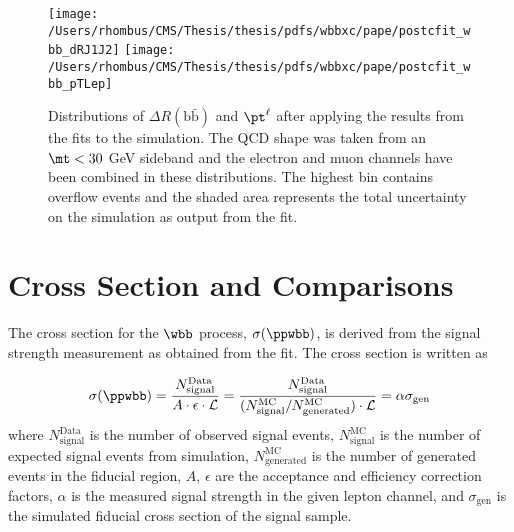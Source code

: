\begin{figure}[!htb]
\center
\texttt{[image: /Users/rhombus/CMS/Thesis/thesis/pdfs/wbbxc/pape/postcfit\_wbb\_dRJ1J2]}
\texttt{[image: /Users/rhombus/CMS/Thesis/thesis/pdfs/wbbxc/pape/postcfit\_wbb\_pTLep]}
\caption{
  Distributions of $\Delta R(\mathrm{b\bar{b}})$ and $\pt^\ell$ after
   applying the results from the fits to the simulation.
  The QCD shape was taken from an $\mt<30$ GeV sideband and the
   electron and muon channels have been combined in these distributions.
  The highest bin contains overflow events and
   the shaded area represents the total uncertainty on the simulation as output from the fit.
 }
\label{fig:postfit_drbb_ptl}
\end{figure}

\section{Cross Section and Comparisons}

The cross section for the $\wbb$ process,
 $\sigma(\ppwbb)$,
 is derived from the signal strength measurement as obtained from the fit.
The cross section is written as

$$\sigma(\ppwbb) = 
\frac{N^{\mathrm{Data}}_{\mathrm{signal}}}{A\cdot\epsilon\cdot \mathcal{L}} = 
\frac{N^{\mathrm{Data}}_{\mathrm{signal}}}{(N^{\mathrm{MC}}_{\mathrm{signal}}/N^{\mathrm{MC}}_{\mathrm{generated}})\cdot \mathcal{L}} =
\alpha \sigma_{\mathrm{gen}}$$
 where
 $N^{\mathrm{Data}}_{\mathrm{signal}}$ is the number of observed signal events,
 $N^{\mathrm{MC}}_{\mathrm{signal}}$ is the number of expected signal events from simulation,
 $N^{\mathrm{MC}}_{\mathrm{generated}}$ is the number of generated events in the fiducial region,
 $A$, $\epsilon$ are the acceptance and efficiency correction factors,
 $\alpha$ is the measured signal strength in the given lepton channel, and
 $\sigma_{\mathrm{gen}}$ is the simulated fiducial cross section of the signal sample.

